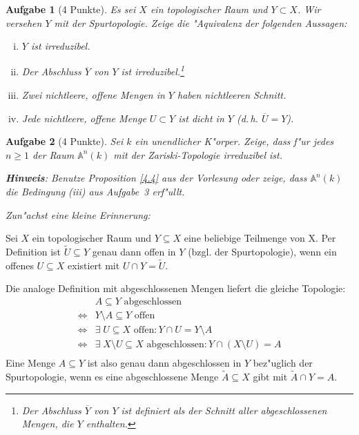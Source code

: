 \documentclass[a4paper, 12pt, numbers=noendperiod, chapterprefix=true, headsepline]{scrbook}
\theoremstyle{break}
\newtheorem{Aufg}{Aufgabe}
\theoremstyle{nonumberbreak}
\theoremstyle{nonumberplain}
\newcommand{\A}{\mathbb{A}}
\begin{document}
\begin{Aufg}[4 Punkte]
Es sei $X$ ein topologischer Raum und $Y\subset X$. Wir versehen $Y$ mit der Spurtopologie. Zeige die "Aquivalenz der folgenden Aussagen:
\begin{enumerate}[i)]
	\item $Y$ ist irreduzibel.
	\item Der Abschluss $\overline{Y}$ von $Y$ ist irreduzibel.\footnote{Der Abschluss $\overline{Y}$ von $Y$ ist definiert als der Schnitt aller abgeschlossenen Mengen, die $Y$ enthalten.}
	\item Zwei nichtleere, offene Mengen in $Y$ haben nichtleeren Schnitt.
	\item Jede nichtleere, offene Menge $U\subset Y$ ist dicht in $Y$ (d.\,h. $\overline{U} = Y$).
\end{enumerate}\end{Aufg}

\begin{Aufg}[4 Punkte]
Sei $k$ ein unendlicher K"orper. Zeige, dass f"ur jedes $n \geq 1$ der Raum $\A^n(k)$ mit der Zariski-Topologie irreduzibel ist.
 
\textbf{Hinweis}: Benutze Proposition \ref{4.4} aus der Vorlesung oder zeige, dass $\A^n(k)$ die Bedingung (iii) aus Aufgabe~3 erf"ullt.
\end{Aufg}

\emph{Zun"achst eine kleine Erinnerung:}

Sei $X$ ein topologischer Raum und $Y \subseteq X$ eine beliebige Teilmenge von X. Per Definition ist $\tilde{U} \subseteq Y$ genau dann offen in $Y$ (bzgl. der Spurtopologie), wenn ein offenes $U \subseteq X$ existiert mit $U \cap Y = \tilde{U}$.

Die analoge Definition mit abgeschlossenen Mengen liefert die gleiche Topologie:
	\[\begin{array}{ll}
		 &A \subseteq Y \textrm{ abgeschlossen }\\
		\Leftrightarrow & Y \setminus A \subseteq Y \textrm{ offen}\\
		\Leftrightarrow & \exists \; U \subseteq X \textrm{ offen}: Y \cap U = Y \setminus A\\
		\Leftrightarrow & \exists \; X \setminus U \subseteq X \textrm{ abgeschlossen} : Y \cap (X\setminus U) = A\\
	\end{array}\]
Eine Menge $A \subseteq Y$ ist also genau dann abgeschlossen in $Y$ bez"uglich der Spurtopologie, wenn es eine abgeschlossene Menge $\tilde{A} \subseteq X$ gibt mit $\tilde{A} \cap Y = A$.
\end{document}
